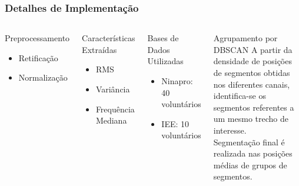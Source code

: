 \documentclass{beamer}
\begin{document}
	\begin{frame}
		\frametitle{Detalhes de Implementação}

		\begin{columns}[c]
		
			\begin{alertblock}{Preprocessamento}
				\begin{itemize}
					\item Retificação
					\item Normalização
				\end{itemize}
			\end{alertblock}
		
			\begin{alertblock}{Características Extraídas}
				\begin{itemize}
					\item RMS
					\item Variância
					\item Frequência Mediana
				\end{itemize}
			\end{alertblock}

			\begin{exampleblock}{Bases de Dados Utilizadas}
				\begin{itemize}
					\item Ninapro: 40 voluntários
					\item IEE: 10 voluntários
				\end{itemize}
			\end{exampleblock}
		
			\begin{block}{Agrupamento por DBSCAN}
				A partir da densidade de posições de segmentos obtidas nos diferentes canais, identifica-se os segmentos referentes a um mesmo trecho de interesse. \\ \vspace*{\baselineskip} Segmentação final é realizada nas posições médias de grupos de segmentos.
			\end{block}
			
		\end{columns}
	\end{frame}
	
\end{document}
